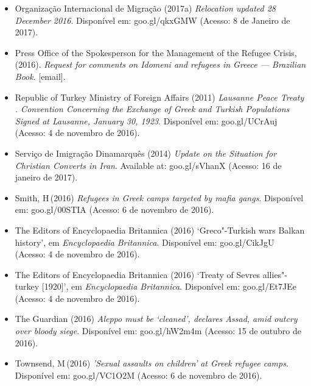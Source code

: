 \begin{itemize}
{  project}. Disponível em: goo.gl/wF40Lo (Acesso: 08 de Janeiro de
  2017).
\item
  Organização Internacional de Migração (2017a) \emph{Relocation updated
  28 December 2016}. Disponível em: goo.gl/qkx{GMW} (Acesso: 8 de Janeiro
  de 2017).
\item
  Press Office of the Spokesperson for the Management of the Refugee
  Crisis, (2016). \emph{Request for comments on Idomeni and refugees in
  Greece --- Brazilian Book}. {[}email{]}.
\item
  Republic of Turkey Ministry of Foreign Affairs (2011) \emph{Lausanne
  Peace Treaty . Convention Concerning the Exchange of Greek and
  Turkish Populations Signed at Lausanne, January 30, 1923}. Disponível
  em: goo.gl/{UC}rAuj (Acesso: 4 de novembro de 2016).
\item
  Serviço de Imigração Dinamarquês (2014) \emph{Update on the Situation
  for Christian Converts in Iran}. Available at: goo.gl/sVhanX (Acesso:
  16 de janeiro de 2017).
\item
  Smith, H\,(2016) \emph{Refugees in Greek camps targeted by mafia
  gangs}. Disponível em: goo.gl/00{STIA} (Acesso: 6 de novembro de 2016).
\item
  The Editors of Encyclopaedia Britannica (2016) `Greco"-Turkish wars
  \textbar{} Balkan history', em \emph{Encyclopaedia} \emph{Britannica}.
  Disponível em: goo.gl/CikJgU (Acesso: 4 de novembro de 2016).
\item
  The Editors of Encyclopaedia Britannica (2016) `Treaty of Sevres
  \textbar{} allies"-turkey {[}1920{]}', em \emph{Encyclopaedia
  Britannica}. Disponível em: goo.gl/Et7{JE}e (Acesso: 4 de novembro de
  2016).
\item
  The Guardian (2016) \emph{Aleppo must be}
  \emph{`}\emph{cleaned}\emph{'}\emph{, declares Assad, amid outcry over
  bloody siege}. Disponível em: goo.gl/hW2m4m (Acesso: 15 de outubro de
  2016).
\item
  Townsend, M\,(2016) \emph{'}\emph{Sexual assaults on children}\emph{'}
  \emph{at Greek refugee camps}. Disponível em: goo.gl/{VC}1O2M (Acesso: 6
  de novembro de 2016).
\end{itemize}
\endgroup
